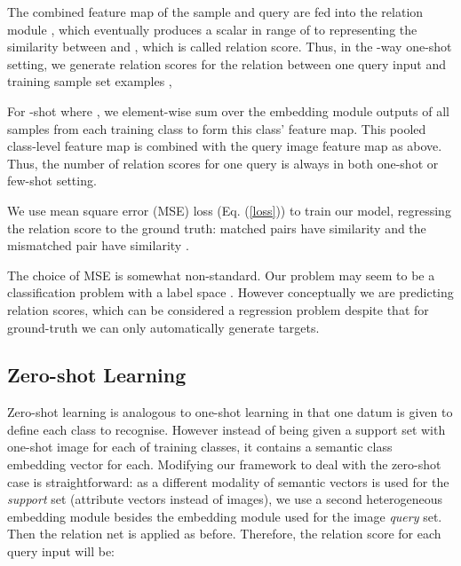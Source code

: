 \documentclass[10pt,twocolumn,letterpaper]{article}
\begin{document}
The combined feature map of the sample and query are fed into the relation module , which eventually produces a scalar in range of  to  representing the similarity between  and , which is called relation score. Thus, in the -way one-shot setting, we generate  relation scores  for the relation between one query input  and training sample set examples ,



For -shot where , we {element-wise sum} over the embedding module outputs of all samples from each training class to form this class' feature map. This pooled class-level feature map is combined with the query image feature map as above. Thus, the number of relation scores for one query is always  in both one-shot or few-shot setting.



We use mean square error (MSE) loss (Eq. (\ref{loss})) to train our model, regressing the relation score  to the ground truth:  matched pairs have similarity  and the mismatched pair have similarity . 




{The choice of MSE  is somewhat non-standard. Our problem may seem to be a classification problem with a label space . However conceptually we are predicting relation scores, which can be considered a regression problem despite that for ground-truth we can only automatically generate  targets. }














\subsection{Zero-shot Learning}\label{method:ZSL}
Zero-shot learning is analogous to one-shot learning in that one datum is given to define each class to recognise. However instead of being given a support set with one-shot image for each of  training classes, it contains a semantic class embedding vector  for each.
Modifying our framework to deal with the zero-shot case is straightforward: as a different modality of semantic vectors is used for the {\em support} set (\eg attribute vectors instead of images), we use a second heterogeneous embedding module   besides the embedding module  used for the image {\em query} set. Then the relation net  is applied as before. Therefore, the relation score for each query input  will be:
\end{document}
